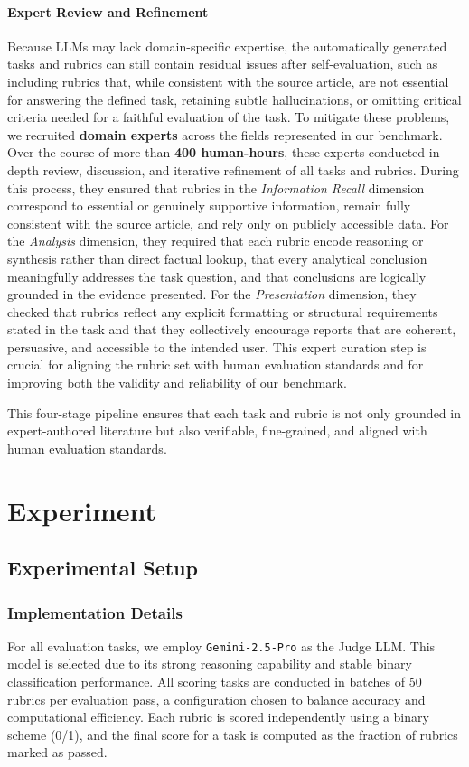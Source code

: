 \documentclass[11pt]{article}
\begin{document}
\paragraph{Expert Review and Refinement}
Because LLMs may lack domain-specific expertise, the automatically generated tasks and rubrics can still contain residual issues after self-evaluation, such as including rubrics that, while consistent with the source article, are not essential for answering the defined task, retaining subtle hallucinations, or omitting critical criteria needed for a faithful evaluation of the task. To mitigate these problems, we recruited \textbf{domain experts} across the fields represented in our benchmark. Over the course of more than \textbf{400 human-hours}, these experts conducted in-depth review, discussion, and iterative refinement of all tasks and rubrics. During this process, they ensured that rubrics in the \emph{Information Recall} dimension correspond to essential or genuinely supportive information, remain fully consistent with the source article, and rely only on publicly accessible data. For the \emph{Analysis} dimension, they required that each rubric encode reasoning or synthesis rather than direct factual lookup, that every analytical conclusion meaningfully addresses the task question, and that conclusions are logically grounded in the evidence presented. For the \emph{Presentation} dimension, they checked that rubrics reflect any explicit formatting or structural requirements stated in the task and that they collectively encourage reports that are coherent, persuasive, and accessible to the intended user. This expert curation step is crucial for aligning the rubric set with human evaluation standards and for improving both the validity and reliability of our benchmark.

\noindent
This four-stage pipeline ensures that each task and rubric is not only grounded in expert-authored literature but also verifiable, fine-grained, and aligned with human evaluation standards.
  
\section{Experiment}
\label{sec:experiment}

\subsection{Experimental Setup}

\subsubsection{Implementation Details}
For all evaluation tasks, we employ \texttt{Gemini-2.5-Pro} as the Judge LLM. 
This model is selected due to its strong reasoning capability and stable binary classification performance. 
All scoring tasks are conducted in batches of 50 rubrics per evaluation pass, a configuration chosen to balance accuracy and computational efficiency. 
Each rubric is scored independently using a binary scheme (0/1), and the final score for a task is computed as the fraction of rubrics marked as passed.
\end{document}
